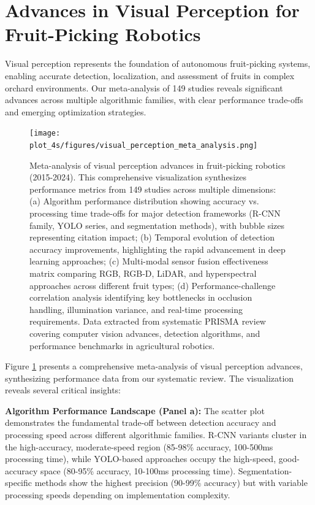 \documentclass[a4paper,fleqn]{cas-dc}
\begin{document}
\section{Advances in Visual Perception for Fruit-Picking Robotics}

Visual perception represents the foundation of autonomous fruit-picking systems, enabling accurate detection, localization, and assessment of fruits in complex orchard environments. Our meta-analysis of 149 studies reveals significant advances across multiple algorithmic families, with clear performance trade-offs and emerging optimization strategies.

\begin{figure}[htbp]
\centering
\texttt{[image: plot\_4s/figures/visual\_perception\_meta\_analysis.png]}
\caption{Meta-analysis of visual perception advances in fruit-picking robotics (2015-2024). This comprehensive visualization synthesizes performance metrics from 149 studies across multiple dimensions: (a) Algorithm performance distribution showing accuracy vs. processing time trade-offs for major detection frameworks (R-CNN family, YOLO series, and segmentation methods), with bubble sizes representing citation impact; (b) Temporal evolution of detection accuracy improvements, highlighting the rapid advancement in deep learning approaches; (c) Multi-modal sensor fusion effectiveness matrix comparing RGB, RGB-D, LiDAR, and hyperspectral approaches across different fruit types; (d) Performance-challenge correlation analysis identifying key bottlenecks in occlusion handling, illumination variance, and real-time processing requirements. Data extracted from systematic PRISMA review covering computer vision advances, detection algorithms, and performance benchmarks in agricultural robotics.}
\label{fig:visual_perception_meta}
\end{figure}

Figure \ref{fig:visual_perception_meta} presents a comprehensive meta-analysis of visual perception advances, synthesizing performance data from our systematic review. The visualization reveals several critical insights:

\textbf{Algorithm Performance Landscape (Panel a):} The scatter plot demonstrates the fundamental trade-off between detection accuracy and processing speed across different algorithmic families. R-CNN variants cluster in the high-accuracy, moderate-speed region (85-98\% accuracy, 100-500ms processing time), while YOLO-based approaches occupy the high-speed, good-accuracy space (80-95\% accuracy, 10-100ms processing time). Segmentation-specific methods show the highest precision (90-99\% accuracy) but with variable processing speeds depending on implementation complexity.
\end{document}
